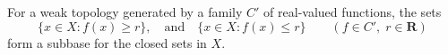 For a weak topology generated by a family $C'$ of real-valued functions, the sets
$$\{x \in X : f(x) \geq r\}, \quad \text{and} \quad \{x \in X : f(x) \leq r\} \qquad (f \in C',\; r \in \mathbf{R})$$
form a subbase for the closed sets in $X$.
